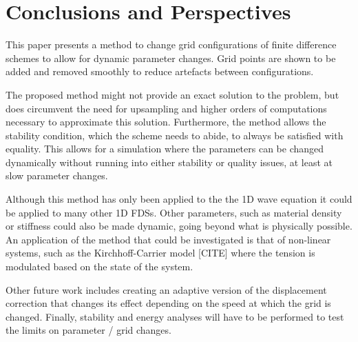 \section{Conclusions and Perspectives}\label{sec:conclusion}
This paper presents a method to change grid configurations of finite difference schemes to allow for dynamic parameter changes. Grid points are shown to be added and removed smoothly to reduce artefacts between configurations. 

The proposed method might not provide an exact solution to the problem, but does circumvent the need for upsampling and higher orders of computations necessary to approximate this solution. %
%
Furthermore, the method allows the stability condition, which the scheme needs to abide, to always be satisfied with equality. This allows for a simulation where the parameters can be changed dynamically without running into either stability or quality issues, at least at slow parameter changes.


Although this method has only been applied to the the 1D wave equation it could be applied to many other 1D FDSs. Other parameters, such as material density or stiffness could also be made dynamic, going beyond what is physically possible. An application of the method that could be investigated is that of non-linear systems, such as the Kirchhoff-Carrier model [CITE] where the tension is modulated based on the state of the system.

Other future work includes creating an adaptive version of the displacement correction that changes its effect depending on the speed at which the grid is changed. Finally, stability and energy analyses will have to be performed to test the limits on parameter / grid changes.
